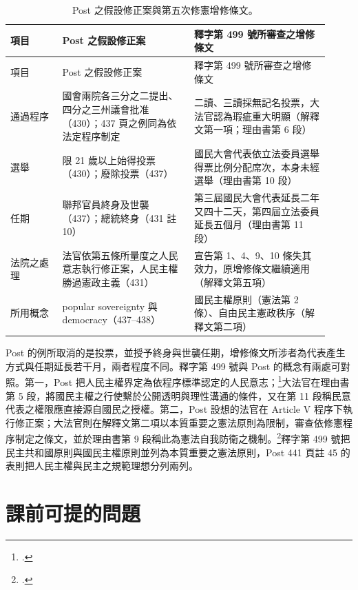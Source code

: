 \begin{longtable}{@{}L{0.15\linewidth}L{0.38\linewidth}L{0.39\linewidth}@{}}
\caption{Post 之假設修正案與第五次修憲增修條文。}\\
\toprule
項目 & Post 之假設修正案 & 釋字第 499 號所審查之增修條文 \\
\midrule
\endfirsthead
\toprule
項目 & Post 之假設修正案 & 釋字第 499 號所審查之增修條文 \\
\midrule
\endhead
通過程序 & 國會兩院各三分之二提出、四分之三州議會批准（430）；437 頁之例同為依法定程序制定 & 二讀、三讀採無記名投票，大法官認為瑕疵重大明顯（解釋文第一項；理由書第 6 段） \\
選舉 & 限 21 歲以上始得投票（430）；廢除投票（437） & 國民大會代表依立法委員選舉得票比例分配席次，本身未經選舉（理由書第 10 段） \\
任期 & 聯邦官員終身及世襲（437）；總統終身（431 註 10） & 第三屆國民大會代表延長二年又四十二天，第四屆立法委員延長五個月（理由書第 11 段） \\
法院之處理 & 法官依第五條所量度之人民意志執行修正案，人民主權勝過憲政主義（431） & 宣告第 1、4、9、10 條失其效力，原增修條文繼續適用（解釋文第五項） \\
所用概念 & popular sovereignty 與 democracy（437--438） & 國民主權原則（憲法第 2 條）、自由民主憲政秩序（解釋文第二項） \\
\bottomrule
\end{longtable}

Post 的例所取消的是投票，並授予終身與世襲任期，增修條文所涉者為代表產生方式與任期延長若干月，兩者程度不同。釋字第 499 號與 Post 的概念有兩處可對照。第一，Post 把人民主權界定為依程序標準認定的人民意志；\footcite[437]{post1998}大法官在理由書第 5 段，將國民主權之行使繫於公開透明與理性溝通的條件，又在第 11 段稱民意代表之權限應直接源自國民之授權。第二，Post 設想的法官在 Article V 程序下執行修正案；大法官則在解釋文第二項以本質重要之憲法原則為限制，審查依修憲程序制定之條文，並於理由書第 9 段稱此為憲法自我防衛之機制。\footcite[解釋文第二項；理由書第 5、9、11 段]{jy499}釋字第 499 號把民主共和國原則與國民主權原則並列為本質重要之憲法原則，Post 441 頁註 45 的表則把人民主權與民主之規範理想分列兩列。

\section{課前可提的問題}
\label{sec:80_comparison-6}

